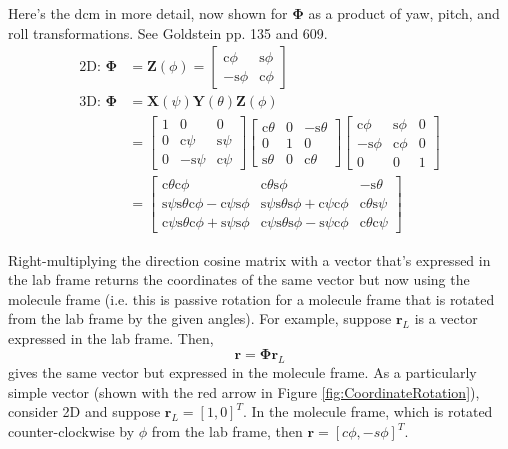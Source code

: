 \documentclass {scrbook}
\begin{document}
Here's the dcm in more detail, now shown for $\bm{\Phi}$ as a product of yaw, pitch, and roll transformations. See Goldstein pp. 135 and 609.
\begin{align}
\textrm{2D: }\bm{\Phi} &= \bm{Z}(\phi)
= \left[ \begin{array}{ccc} \textrm{c} \phi & \textrm{s} \phi \\ -\textrm{s} \phi & \textrm{c} \phi \end{array} \right] \nonumber \\
\textrm{3D: }\bm{\Phi} &= \bm{X}(\psi) \bm{Y}(\theta) \bm{Z}(\phi) \nonumber \\
&= \left[ \begin{array}{ccc} 1 & 0 & 0 \\ 0 & \textrm{c} \psi & \textrm{s} \psi \\ 0 & -\textrm{s} \psi & \textrm{c} \psi \end{array} \right]
\left[ \begin{array}{ccc} \textrm{c} \theta & 0 & -\textrm{s} \theta \\ 0 & 1 & 0 \\ \textrm{s} \theta & 0 & \textrm{c} \theta \end{array} \right]
\left[ \begin{array}{ccc} \textrm{c} \phi & \textrm{s} \phi & 0 \\ -\textrm{s} \phi & \textrm{c} \phi & 0 \\ 0 & 0 & 1 \end{array} \right] \nonumber \\
&= \left[ \begin{array}{ccc} \textrm{c} \theta \textrm{c} \phi & \textrm{c} \theta \textrm{s} \phi & -\textrm{s} \theta \\ \textrm{s} \psi \textrm{s} \theta \textrm{c} \phi - \textrm{c} \psi \textrm{s} \phi & \textrm{s} \psi \textrm{s} \theta \textrm{s} \phi + \textrm{c} \psi \textrm{c} \phi & \textrm{c} \theta \textrm{s} \psi \\ \textrm{c} \psi \textrm{s} \theta \textrm{c} \phi + \textrm{s} \psi \textrm{s} \phi & \textrm{c} \psi \textrm{s} \theta \textrm{s} \phi - \textrm{s} \psi \textrm{c} \phi & \textrm{c} \theta \textrm{c} \psi \end{array} \right]
\label{eq:CoordinateRotationYPR}
\end{align}

Right-multiplying the direction cosine matrix with a vector that's expressed in the lab frame returns the coordinates of the same vector but now using the molecule frame (i.e. this is passive rotation for a molecule frame that is rotated from the lab frame by the given angles). For example, suppose $\bm{r}_L$ is a vector expressed in the lab frame. Then,
\begin{equation}
\bm{r} = \bm{\Phi} \bm{r}_L
\end{equation}
gives the same vector but expressed in the molecule frame. As a particularly simple vector (shown with the red arrow in Figure \ref{fig:CoordinateRotation}), consider 2D and suppose $\bm{r}_L=[1,0]^T$. In the molecule frame, which is rotated counter-clockwise by $\phi$ from the lab frame, then $\bm{r} = [c \phi,- s\phi]^T$.
\end{document}
